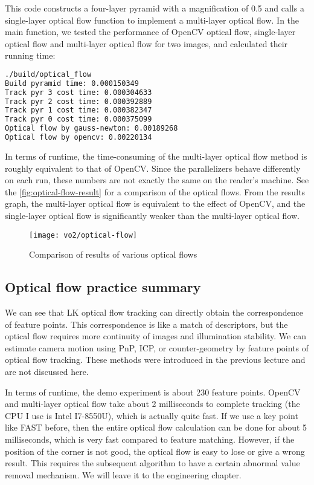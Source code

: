 This code constructs a four-layer pyramid with a magnification of 0.5 and calls a single-layer optical flow function to implement a multi-layer optical flow. In the main function, we tested the performance of OpenCV optical flow, single-layer optical flow and multi-layer optical flow for two images, and calculated their running time:
\begin{lstlisting}[language=sh,caption=terminal input:]
./build/optical_flow
Build pyramid time: 0.000150349
Track pyr 3 cost time: 0.000304633
Track pyr 2 cost time: 0.000392889
Track pyr 1 cost time: 0.000382347
Track pyr 0 cost time: 0.000375099
Optical flow by gauss-newton: 0.00189268
Optical flow by opencv: 0.00220134
\end{lstlisting}
In terms of runtime, the time-consuming of the multi-layer optical flow method is roughly equivalent to that of OpenCV. Since the parallelizers behave differently on each run, these numbers are not exactly the same on the reader's machine. See the \autoref{fig:optical-flow-result} for a comparison of the optical flows. From the results graph, the multi-layer optical flow is equivalent to the effect of OpenCV, and the single-layer optical flow is significantly weaker than the multi-layer optical flow.

\begin{figure}[!htp]
\centering
\texttt{[image: vo2/optical-flow]}
\caption{Comparison of results of various optical flows}
\label{fig:optical-flow-result}
\end{figure}

\subsection{Optical flow practice summary}
We can see that LK optical flow tracking can directly obtain the correspondence of feature points. This correspondence is like a match of descriptors, but the optical flow requires more continuity of images and illumination stability. We can estimate camera motion using PnP, ICP, or counter-geometry by feature points of optical flow tracking. These methods were introduced in the previous lecture and are not discussed here.

In terms of runtime, the demo experiment is about 230 feature points. OpenCV and multi-layer optical flow take about 2 milliseconds to complete tracking (the CPU I use is Intel I7-8550U), which is actually quite fast. If we use a key point like FAST before, then the entire optical flow calculation can be done for about 5 milliseconds, which is very fast compared to feature matching. However, if the position of the corner is not good, the optical flow is easy to lose or give a wrong result. This requires the subsequent algorithm to have a certain abnormal value removal mechanism. We will leave it to the engineering chapter.


